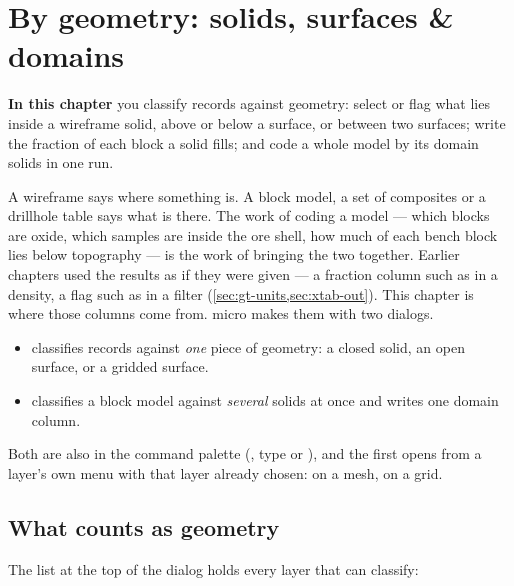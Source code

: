 \chapter{By geometry: solids, surfaces \& domains}\label{ch:geometry}
\begin{goals}
\textbf{In this chapter} you classify records against geometry: select or flag what lies inside a wireframe solid, above or below a surface, or between two surfaces; write the fraction of each block a solid fills; and code a whole model by its domain solids in one run.
\end{goals}

A wireframe says where something is. A block model, a set of composites or a drillhole table says what is there. The work of coding a model — which blocks are oxide, which samples are inside the ore shell, how much of each bench block lies below topography — is the work of bringing the two together. Earlier chapters used the results as if they were given — a fraction column such as  in a density, a flag such as  in a filter (\cref{sec:gt-units,sec:xtab-out}). This chapter is where those columns come from. micro makes them with two dialogs.

\begin{itemize}
\item {} classifies records against \emph{one} piece of geometry: a closed solid, an open surface, or a gridded surface.
\item {} classifies a block model against \emph{several} solids at once and writes one domain column.
\end{itemize}

Both are also in the command palette (, type  or ), and the first opens from a layer's own menu with that layer already chosen:  on a mesh,  on a grid.

\section{What counts as geometry}\label{sec:geometry-kinds}

The  list at the top of the dialog holds every layer that can classify:


